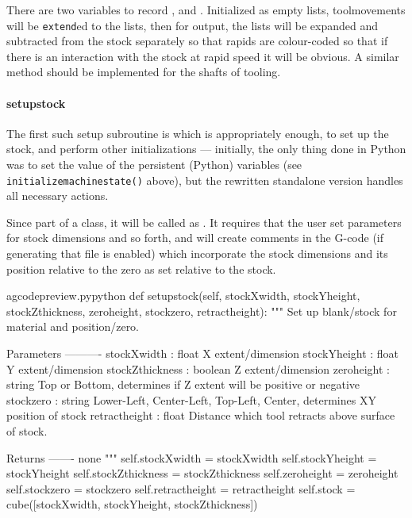\documentclass{ltxdoc}
\begin{document}
There are two variables to record ,  and . Initialized as empty lists, toolmovements will be \verb|extend|ed to the lists, then for output, the lists will be expanded and subtracted from the stock separately so that rapids are colour-coded so that if there is an interaction with the stock at rapid speed it will be obvious. A similar method should be implemented for the shafts of tooling.

\paragraph{setupstock}

The first such setup subroutine is   which is appropriately enough, to set up the stock, and perform other initializations --- initially, the only thing done in Python was to set the value of the persistent (Python) variables (see \verb|initializemachinestate()| above), but the rewritten standalone version handles all necessary actions.

Since part of a class, it will be called as . It requires that the user set parameters for stock dimensions and so forth, and will create comments in the G-code (if generating that file is enabled) which incorporate the stock dimensions and its position relative to the zero as set relative to the stock.

\lstset{firstnumber=\thegcpy}
\begin{writecode}{a}{gcodepreview.py}{python}
    def setupstock(self, stockXwidth,
                   stockYheight,
                   stockZthickness,
                   zeroheight,
                   stockzero,
                   retractheight):
        """
        Set up blank/stock for material and position/zero.
        
        Parameters
        ----------
        stockXwidth :   float
                        X extent/dimension
        stockYheight :  float
                        Y extent/dimension
        stockZthickness : boolean
                        Z extent/dimension
        zeroheight :    string
                        Top or Bottom, determines if Z extent will be positive or negative
        stockzero :     string
                        Lower-Left, Center-Left, Top-Left, Center, determines XY position of stock 
        retractheight : float
                        Distance which tool retracts above surface of stock.
        
        Returns
        -------
        none
        """
        self.stockXwidth = stockXwidth
        self.stockYheight = stockYheight
        self.stockZthickness = stockZthickness
        self.zeroheight = zeroheight
        self.stockzero = stockzero
        self.retractheight = retractheight 
        self.stock = cube([stockXwidth, stockYheight, stockZthickness]) 

\end{writecode}
\addtocounter{gcpy}{36}
\end{document}
